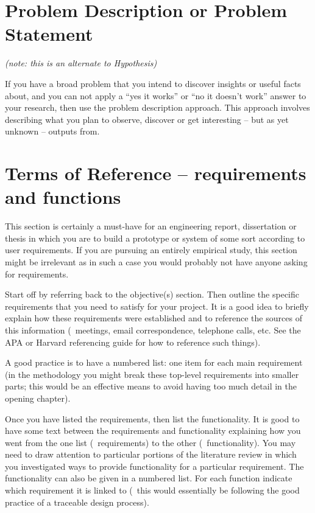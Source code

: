 \section{Problem Description or Problem Statement}

\emph{(note: this is an alternate to Hypothesis)}

If you have a broad problem that you intend to discover insights or useful facts about, and you can not apply a ``yes it works'' or ``no it doesn't work'' answer to your research, then use the problem description approach.  This approach involves describing what you plan to observe, discover or get interesting -- but as yet unknown -- outputs from.

\section{Terms of Reference -- requirements and functions}

This section is certainly a must-have for an engineering report, dissertation or thesis in which you are to build a prototype or system of some sort according to user requirements.  If you are pursuing an entirely empirical study, this section might be irrelevant as in such a case you would probably not have anyone asking for requirements.

Start off by referring back to the objective(s) section. Then outline the specific requirements that you need to satisfy for your project. It is a good idea to briefly explain how these requirements were established and to reference the sources of this information (\eg~meetings, email correspondence, telephone calls, etc.  See the APA or Harvard referencing guide for how to reference such things).

A good practice is to have a numbered list: one item for each main requirement (in the methodology you might break these top-level requirements into smaller parts; this would be an effective means to avoid having too much detail in the opening chapter).

Once you have listed the requirements, then list the functionality. It is good to have some text between the requirements and functionality explaining how you went from the one list (\ie~requirements) to the other (\ie~functionality).  You may need to draw attention to particular portions of the literature review in which you investigated ways to provide functionality for a particular requirement. The functionality can also be given in a numbered list. For each function indicate which requirement it is linked to (\ie~this would essentially be following the good practice of a traceable design process).

